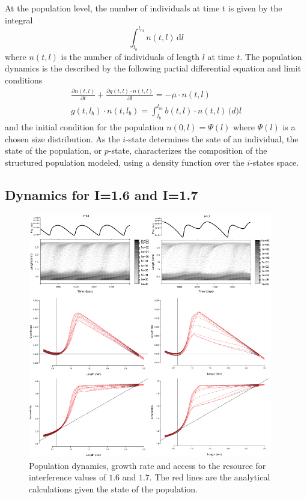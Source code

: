 At the population level, the number of individuals at time t is given by the
integral
\begin{equation}
\label{eq_10}
\int_{l_b}^{l_m}\!n(t,l)\,\mathrm{d}l
\end{equation}
where $n(t,l)$ is the number of individuals of length $l$ at time $t$. The
population dynamics is the described by the following partial differential
equation and limit conditions \autocite{kooijman1984a,de-roos1997a}
\begin{align}
\label{eq_11}
\frac{\partial n(t,l)}{\partial t}+\frac{\partial g(t,l) \cdot n(t,l)}{\partial l}=-\mu \cdot n(t,l) \\
g(t,l_b) \cdot n(t,l_b)= \int_{l_b} ^{l_m} \! b(t,l)\cdot n(t,l)\, \mathrm(d)l
\end{align}
and the initial condition for the population $n(0,l)=\Psi(l)$ where $\Psi(l)$ is
a chosen size distribution. As the $i$-state determines the sate of an
individual, the state of the population, or $p$-state, characterizes the
composition of the structured population modeled, using a density function over
the $i$-states space. 

\newpage
\subsection{Dynamics for I=1.6 and I=1.7}\label{subsec:SupMat3}

\begin{figure}[H] %
\centering
\includegraphics[width=0.95\textwidth]{4_ChapThe1/Fig/FigSM6}
\caption[Sample dynamics for I=1.6 and
I=1.7]{Population dynamics, growth rate and access to the resource for interference values of $1.6$ and $1.7$. The red lines are the analytical calculations given the state of the population.}
\label{Fig4-SM6}
\end{figure}


